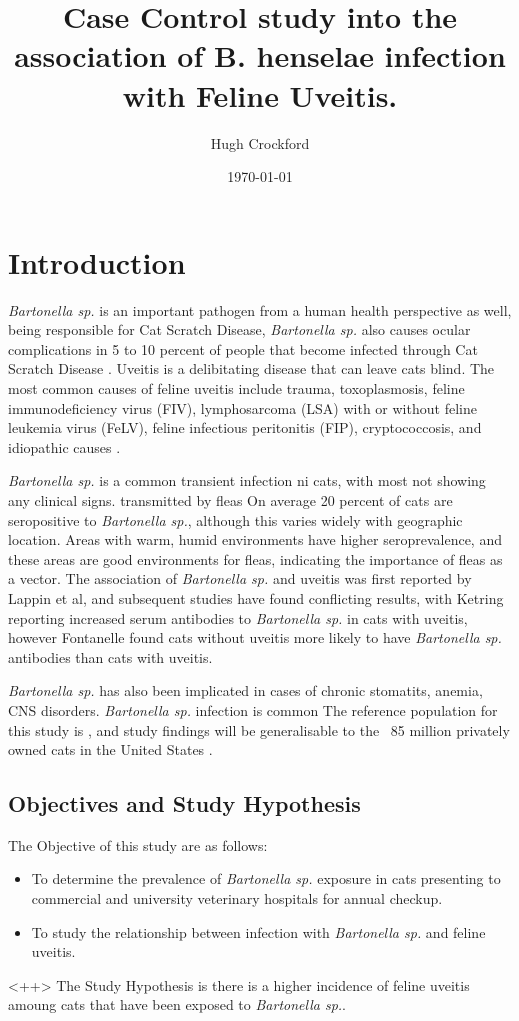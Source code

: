 \documentclass[12pt]{article}
\title{Case Control study into the association of B. henselae infection with Feline Uveitis.}
\author{Hugh Crockford}
\date{\today}
\begin{document}
	\section{Introduction}
		\emph{Bartonella sp.} is an important pathogen from a human health perspective as well, being responsible for Cat Scratch Disease, 
		\emph{Bartonella sp.} also causes ocular complications in 5 to 10 percent of people that become infected through Cat Scratch Disease \cite{Wade2000}.
		Uveitis is a delibitating disease that can leave cats blind. 
		The most common causes of feline uveitis include trauma, toxoplasmosis, feline immunodeficiency virus (FIV), lymphosarcoma (LSA) with or without feline leukemia virus (FeLV), feline infectious peritonitis (FIP), cryptococcosis, and idiopathic causes \cite{Powell2001}.


		\emph{Bartonella sp.} is a common transient infection ni cats, with most not showing any clinical signs. 
		transmitted by fleas
		On average 20 percent of cats are seropositive to \emph{Bartonella sp.}, although this varies widely with geographic location\cite{Jameson1995a}. Areas with warm, humid environments have higher seroprevalence, and these areas are good environments for fleas, indicating the importance of fleas as a vector.
		The association of \emph{Bartonella sp.} and uveitis was first reported by Lappin et al\cite{Lappin1999}, and subsequent studies have found conflicting results, with Ketring reporting increased serum antibodies to \emph{Bartonella sp.} in cats with uveitis\cite{Ketring2004}, however Fontanelle found cats without uveitis more likely to have \emph{Bartonella sp.} antibodies than cats with uveitis.
		
		\emph{Bartonella sp.} has also been implicated in cases of chronic stomatits, anemia, CNS disorders\cite{Nasir2005}.
		\emph{Bartonella sp.} infection is common
		The reference population for this study is , and study findings will be generalisable to the ~85 million privately owned cats in the United States \cite{HSUSown}.

		\subsection{Objectives and Study Hypothesis}
			The Objective of this study are as follows: 
				\begin{itemize}
					\item To determine the prevalence of \emph{Bartonella sp.} exposure in cats presenting to commercial and university veterinary hospitals for annual checkup.
					\item To study the relationship between infection with \emph{Bartonella sp.} and feline uveitis.
				\end{itemize}<++>
			The Study Hypothesis is there is a higher incidence of feline uveitis amoung cats that have been exposed to \emph{Bartonella sp.}.
\end{document}
